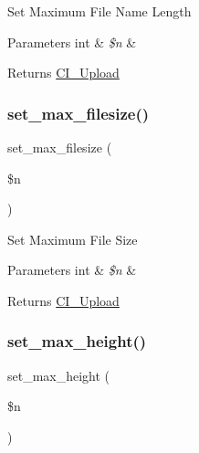 Set Maximum File Name Length


\begin{DoxyParams}[1]{Parameters}
int & {\em \$n} & \\
\hline
\end{DoxyParams}
\begin{DoxyReturn}{Returns}
\mbox{\hyperlink{class_c_i___upload}{C\+I\+\_\+\+Upload}} 
\end{DoxyReturn}
\mbox{\label{class_c_i___upload_a1f78c3a54f32d313294b27cde4eafaf4}} 
\subsubsection{\texorpdfstring{set\+\_\+max\+\_\+filesize()}{set\_max\_filesize()}}
{\footnotesize\ttfamily set\+\_\+max\+\_\+filesize (\begin{DoxyParamCaption}\item[{}]{\$n }\end{DoxyParamCaption})}

Set Maximum File Size


\begin{DoxyParams}[1]{Parameters}
int & {\em \$n} & \\
\hline
\end{DoxyParams}
\begin{DoxyReturn}{Returns}
\mbox{\hyperlink{class_c_i___upload}{C\+I\+\_\+\+Upload}} 
\end{DoxyReturn}
\mbox{\label{class_c_i___upload_aaed82d431f5aeee6a0af294bc604a51e}} 
\subsubsection{\texorpdfstring{set\+\_\+max\+\_\+height()}{set\_max\_height()}}
{\footnotesize\ttfamily set\+\_\+max\+\_\+height (\begin{DoxyParamCaption}\item[{}]{\$n }\end{DoxyParamCaption})}


